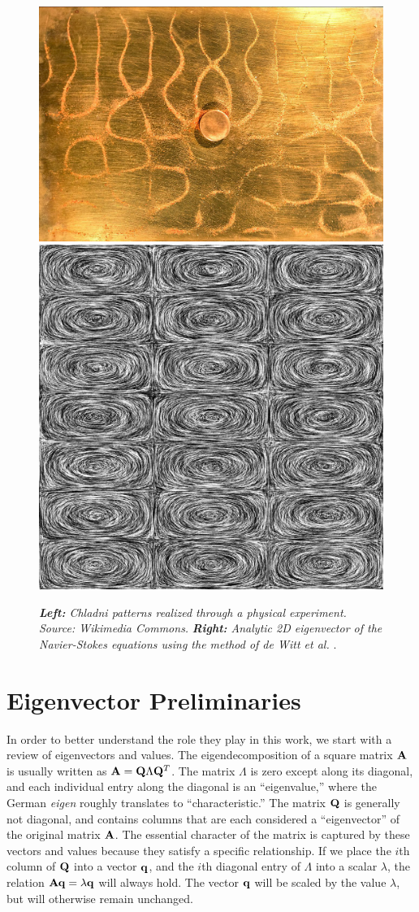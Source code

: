 \documentclass[11pt]{article}
\begin{document}
\begin{figure}
		\centering
		\includegraphics[height=0.3\textwidth]{Figures/chladni_plate.jpg}
		\includegraphics[height=0.3\textwidth]{Figures/LIC.jpg}
		\caption{{\em{\bf Left:} Chladni patterns realized through a physical experiment. Source: Wikimedia Commons.} {\em{\bf Right:} Analytic 2D eigenvector of the Navier-Stokes equations using the method of de Witt et al.} \cite{deWitt:2012}.}
		\label{fig:chladni-plate}
\end{figure}

\section*{Eigenvector Preliminaries}
In order to better understand the role they play in this work, we start with a review of eigenvectors and values. The eigendecomposition of a square matrix $\mathbf{A}$ is usually written as $\mathbf{A} = \mathbf{Q} \Lambda \mathbf{Q}^T$. The matrix $\Lambda$ is zero except along its diagonal, and each individual entry along the diagonal is an ``eigenvalue,'' where the German {\em eigen} roughly translates to ``characteristic.'' The matrix $\mathbf{Q}$ is generally not diagonal, and contains columns that are each considered a ``eigenvector'' of the original matrix $\mathbf{A}$. The essential character of the matrix is captured by these vectors and values because they satisfy a specific relationship. If we place the $i$th column of $\mathbf{Q}$ into a vector $\mathbf{q}$, and the $i$th diagonal entry of $\Lambda$ into a scalar $\lambda$, the relation $\mathbf{A} \mathbf{q} = \lambda \mathbf{q}$ will always hold. The vector $\mathbf{q}$ will be scaled by the value $\lambda$, but will otherwise remain unchanged.
\end{document}
